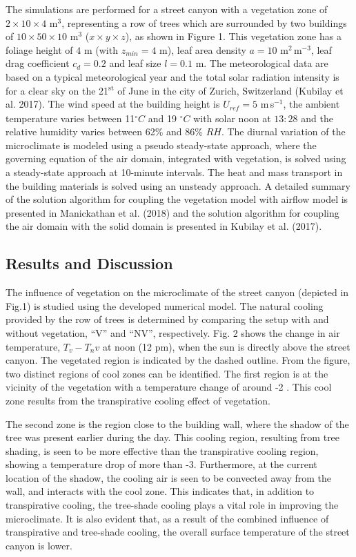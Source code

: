 The simulations are performed for a street canyon with a vegetation zone of $2 \times 10 \times 4$ m$^3$, representing a row of trees which are surrounded by two buildings of $10 \times 50 \times 10$ m$^3$ ($x\times y \times z$), as shown in Figure 1. This vegetation zone has a foliage height of $4$ m (with $z_{\textit{min}}= 4$ m), leaf area density $a= 10$ m$^2$\,m$^{-3}$, leaf drag coefficient $c_d=0.2$ and leaf size $l=0.1$ m. The meteorological data are based on a typical meteorological year and the total solar radiation intensity is for a clear sky on the 21$^{\mathrm{st}}$ of June in the city of Zurich, Switzerland (Kubilay et al. 2017). The wind speed at the building height is $U_{\textit{ref}}=5$ m\,s$^{-1}$, the ambient temperature varies between 11$^{\circ}C$ and 19 $^{\circ}C$ with solar noon at $13:28$ and the relative humidity varies between 62\% and 86\% $RH$. The diurnal variation of the microclimate is modeled using a pseudo steady-state approach, where the governing equation of the air domain, integrated with vegetation, is solved using a steady-state approach at 10-minute intervals. The heat and mass transport in the building materials is solved using an unsteady approach. A detailed summary of the solution algorithm for coupling the vegetation model with airflow model is presented in Manickathan et al. (2018) and the solution algorithm for coupling the air domain with the solid domain is presented in Kubilay et al. (2017).

\subsection{Results and Discussion}

The influence of vegetation on the microclimate of the street canyon (depicted in Fig.1) is studied using the developed numerical model. The natural cooling provided by the row of trees is determined by comparing the setup with and without vegetation, “V” and “NV”, respectively. Fig. 2 shows the change in air temperature, $T_v-T_nv$ at noon (12 pm), when the sun is directly above the street canyon. The vegetated region is indicated by the dashed outline. From the figure, two distinct regions of cool zones can be identified. The first region is at the vicinity of the vegetation with a temperature change of around -2 . This cool zone results from the transpirative cooling effect of vegetation. 

The second zone is the region close to the building wall, where the shadow of the tree was present earlier during the day. This cooling region, resulting from tree shading, is seen to be more effective than the transpirative cooling region, showing a temperature drop of more than -3. Furthermore, at the current location of the shadow, the cooling air is seen to be convected away from the wall, and interacts with the cool zone. This indicates that, in addition to transpirative cooling, the tree-shade cooling plays a vital role in improving the microclimate. It is also evident that, as a result of the combined influence of transpirative and tree-shade cooling, the overall surface temperature of the street canyon is lower.

